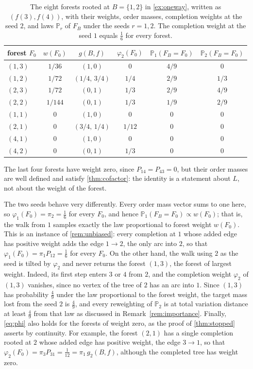 \documentclass[onefignum,onetabnum]{siamart250211}
\numberwithin{theorem}{section}
\numberwithin{equation}{section}
\newcommand{\pr}{\mathbb{P}}
\begin{document}
\begin{example}
\begin{table}[ht]
\caption{The eight forests rooted at $B=\{1,2\}$ in \cref{ex:oneway},
written as $(f(3),f(4))$, with their weights, order masses, completion
weights at the seed $2$, and laws $\pr_r$ of $F_B$ under the seeds
$r=1,2$. The completion weight at the seed $1$ equals $\tfrac16$ for
every forest.}\label{tab:oneway-forests}
\centering
\small
\begin{tabular}{@{}lccccc@{}}
\toprule
forest $F_0$ & $w(F_0)$ & $g(B,f)$ & $\varphi_2(F_0)$ & $\pr_1(F_B=F_0)$ & $\pr_2(F_B=F_0)$\\
\midrule
$(1,3)$ & $1/36$ & $(1,0)$ & $0$ & $4/9$ & $0$\\
$(1,2)$ & $1/72$ & $(1/4,\,3/4)$ & $1/4$ & $2/9$ & $1/3$\\
$(2,3)$ & $1/72$ & $(0,1)$ & $1/3$ & $2/9$ & $4/9$\\
$(2,2)$ & $1/144$ & $(0,1)$ & $1/3$ & $1/9$ & $2/9$\\
$(1,1)$ & $0$ & $(1,0)$ & $0$ & $0$ & $0$\\
$(2,1)$ & $0$ & $(3/4,\,1/4)$ & $1/12$ & $0$ & $0$\\
$(4,1)$ & $0$ & $(1,0)$ & $0$ & $0$ & $0$\\
$(4,2)$ & $0$ & $(0,1)$ & $1/3$ & $0$ & $0$\\
\bottomrule
\end{tabular}
\end{table}

The last four forests have weight zero, since $P_{14}=P_{43}=0$, but their order
masses are well defined and satisfy \cref{thm:cofactor}: the identity
is a statement about $L$, not about the weight of the forest.

The two seeds behave very differently. Every order mass vector sums to
one here, so $\varphi_1(F_0)=\pi_2=\tfrac16$ for every $F_0$, and hence $\pr_1(F_B=F_0)\propto w(F_0)$; that is, the walk from $1$
samples exactly the law proportional to forest weight $w(F_0)$. This is an instance of
\cref{rem:unbiased}: every completion at $1$ whose added edge has
positive weight adds the edge $1\to2$, the only arc into $2$, so that
$\varphi_1(F_0)=\pi_1P_{12}=\tfrac16$ for every $F_0$. On the other hand,
the walk using $2$ as the seed is tilted by $\varphi_2$ and never returns the forest
$(1,3)$, the forest of largest weight. Indeed, its first step enters
$3$ or $4$ from $2$, and the completion weight $\varphi_2$ of $(1,3)$
vanishes, since no vertex of the tree of $2$ has an arc into $1$. Since
$(1,3)$ has probability $\tfrac49$ under the law proportional to the
forest weight, the target mass lost from the seed $2$ is $\tfrac49$, and
every reweighting of $\pr_2$ is at total variation distance at least
$\tfrac49$ from that law as discussed in Remark~\ref{rem:importance}.
Finally, \eqref{eq:phi} also holds for the forests of weight zero, as
the proof of \cref{thm:stopped} asserts by continuity. For example,
the forest $(2,1)$ has a single completion rooted at $2$ whose added
edge has positive weight, the edge $3\to1$, so that
$\varphi_2(F_0)=\pi_3P_{31}=\tfrac1{12}=\pi_1\,g_2(B,f)$, although the
completed tree has weight zero.
\end{example}
\end{document}
